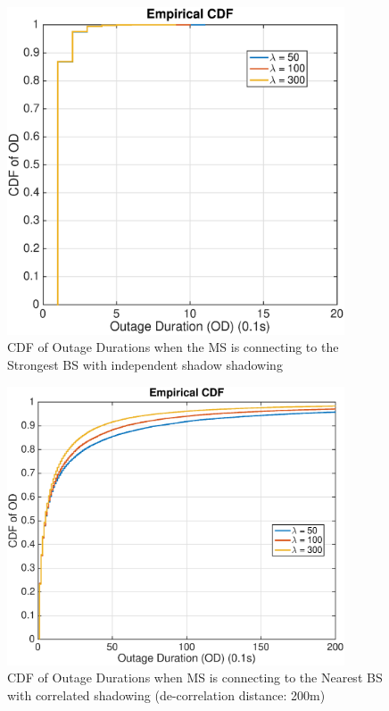  \begin{figure}
 \centering
 \includegraphics[width=10cm]{ODthresh-5iidMax.eps}
 \caption{CDF of Outage Durations when the MS is connecting to the Strongest BS with independent shadow shadowing}
 \label{iid2}
 \end{figure}
 \begin{figure}
 \centering
 \includegraphics[width=10cm]{ODthresh-5DeCorr200NBMode2.eps}
 \caption{CDF of Outage Durations when MS is connecting to the Nearest BS with correlated shadowing (de-correlation distance: 200m)}
 \label{corr1}
 \end{figure}
